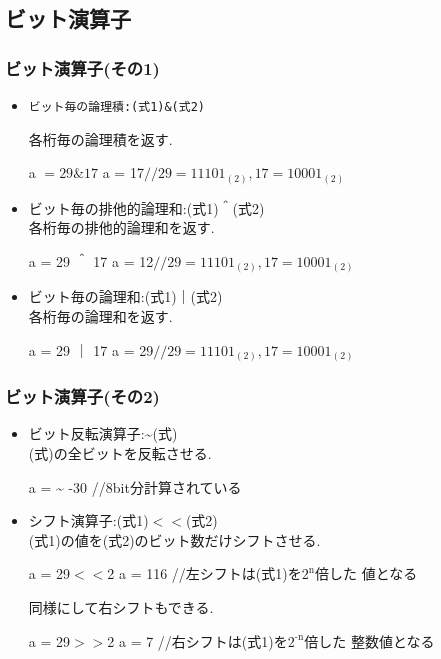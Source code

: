 \documentclass[dvipdfmx]{beamer}
\begin{document}
\subsection{ビット演算子}
\begin{frame}[t, fragile, label=22]
    \frametitle{ビット演算子(その1)}
    \begin{itemize}
        \item \begin{verbatim}ビット毎の論理積:(式1)&(式2)\end{verbatim}
            \qquad 各桁毎の論理積を返す.
            \begin{block}{a $= 29 \& 17$}
                a = 17\qquad $//29=11101_{(2)},17=10001_{(2)}$
            \end{block}
        \item ビット毎の排他的論理和:(式1)＾(式2)\\
            \qquad 各桁毎の排他的論理和を返す.
            \begin{block}{a = 29 ＾ 17}
                a = 12\qquad $//29=11101_{(2)},17=10001_{(2)}$
            \end{block}
        \item ビット毎の論理和:(式1)｜(式2)\\
            \qquad 各桁毎の論理和を返す.
            \begin{block}{a = 29 ｜ 17}
                a = 29\qquad $//29=11101_{(2)},17=10001_{(2)}$
            \end{block}
    \end{itemize}
    \vfill \hfill 
    \hyperlink{21}{}
    \space
    \hyperlink{23}{}
\end{frame}

\begin{frame}[t, fragile, label=23]
    \frametitle{ビット演算子(その2)}
    \begin{itemize}
        \item ビット反転演算子:\~\space (式)\\
            \qquad (式)の全ビットを反転させる.
            \begin{block}{a = \~}
                -30 \qquad //8bit分計算されている
            \end{block}
        \item シフト演算子:(式1)$<<$(式2)\\
            \qquad (式1)の値を(式2)のビット数だけシフトさせる. 
            \begin{block}{a = 29$<<$2}
                a = 116 \qquad //左シフトは(式1)を$2^{\textrm{n}}$倍した
                値となる
            \end{block}
            \qquad 同様にして右シフトもできる.
            \begin{block}{a = 29$>>$2}
                a = 7 \qquad //右シフトは(式1)を$2^{\textrm{-n}}$倍した
                整数値となる
            \end{block}
    \end{itemize}
    \vfill \hfill 
    \hyperlink{22}{}
    \space
    \hyperlink{24}{}
\end{frame}
\end{document}

